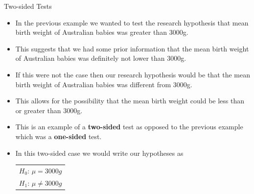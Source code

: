 \documentclass[handout]{beamer}
\begin{document}
\begin{frame}[fragile]{Two-sided Tests}
\scriptsize{
\begin{itemize}
 \item In the previous example we wanted to test the research hypothesis that mean birth weight of Australian babies was greater than 3000g.
 \item This suggests that we had some prior information that the mean birth weight of Australian babies was definitely not lower than 3000g. 
 \item If this were not the case then our research hypothesis would be that the mean birth weight of Australian babies was different from 3000g. 
 \item This allows for the possibility that the mean birth weight could be less than or greater than 3000g.
 \item This is an example of a \textbf{two-sided} test as opposed to the previous example which was a \textbf{one-sided} test.
 
 \item In this two-sided case we would write our hypotheses as
 \begin{table}
\center
 \begin{tabular}{c}  
$H_0$: $\mu=3000g$ \\  
$H_1$: $\mu\neq3000g$
\end{tabular} 
\end{table}
\end{itemize}
} 
\end{frame}
\end{document}
